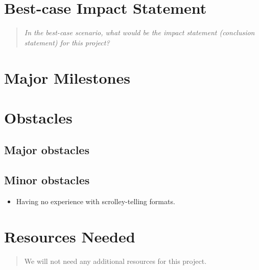 \documentclass{proc}
\begin{document}
\section{Best-case Impact Statement}
\begin{quote}
\textit{In the best-case scenario, what would be the impact statement (conclusion statement) for this project? \cite{wijk2005value}}
\end{quote}

\section{Major Milestones}

\section{Obstacles}

\subsection{Major obstacles} %

\subsection{Minor obstacles}
\begin{itemize}
    \item Having no experience with scrolley-telling formats.
\end{itemize}
\section{Resources Needed}
\begin{quote}
We will not need any additional resources for this project.
\end{quote}
\end{document}

